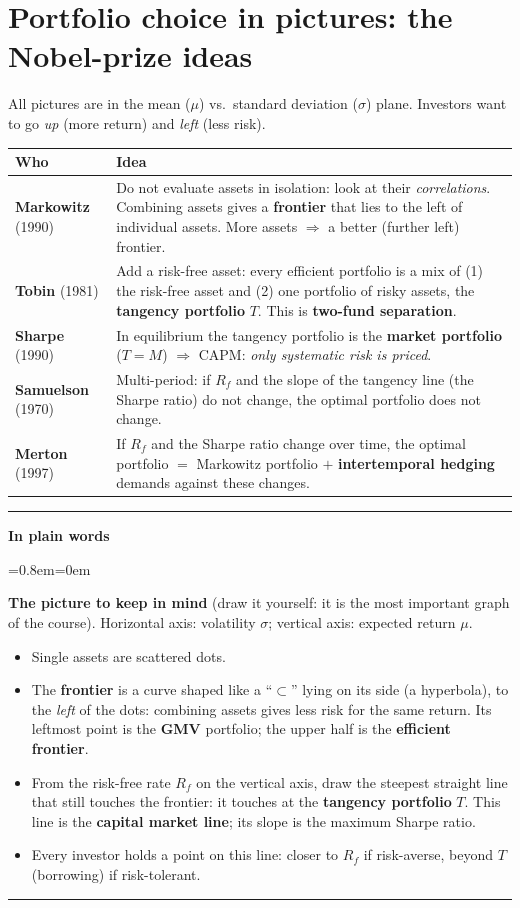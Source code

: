 \documentclass[11pt,a4paper]{report}
\newenvironment{notebox}[1]
  {\par\medskip\Needspace{6\baselineskip}\noindent\rule{\linewidth}{0.4pt}\par\nopagebreak
   \noindent\textbf{#1}\par\nopagebreak
   \begin{list}{}{\leftmargin=0.8em\rightmargin=0em\topsep=2pt}\item[]}
  {\end{list}\nopagebreak\noindent\rule{\linewidth}{0.4pt}\par\medskip}
\newenvironment{plainbox}{\begin{notebox}{In plain words}}{\end{notebox}}
\begin{document}
\section{Portfolio choice in pictures: the Nobel-prize ideas}
All pictures are in the mean ($\mu$) vs.\ standard deviation ($\sigma$) plane.
Investors want to go \emph{up} (more return) and \emph{left} (less risk).
\begin{center}
\begin{tabularx}{\textwidth}{@{}lX@{}}
\toprule
Who & Idea \\
\midrule
\textbf{Markowitz} (1990) & Do not evaluate assets in isolation: look at their
\emph{correlations}. Combining assets gives a \textbf{frontier} that lies to the
left of individual assets. More assets $\Rightarrow$ a better (further left) frontier. \\
\textbf{Tobin} (1981) & Add a risk-free asset: every efficient portfolio is a mix
of (1) the risk-free asset and (2) one portfolio of risky assets, the
\textbf{tangency portfolio} $T$. This is \textbf{two-fund separation}. \\
\textbf{Sharpe} (1990) & In equilibrium the tangency portfolio is the
\textbf{market portfolio} ($T=M$) $\Rightarrow$ CAPM: \emph{only systematic risk is priced}. \\
\textbf{Samuelson} (1970) & Multi-period: if $R_f$ and the slope of the
tangency line (the Sharpe ratio) do not change, the optimal portfolio does not change. \\
\textbf{Merton} (1997) & If $R_f$ and the Sharpe ratio change over time, the
optimal portfolio $=$ Markowitz portfolio $+$ \textbf{intertemporal hedging}
demands against these changes. \\
\bottomrule
\end{tabularx}
\end{center}

\begin{plainbox}
\textbf{The picture to keep in mind} (draw it yourself: it is the most important
graph of the course). Horizontal axis: volatility $\sigma$; vertical axis:
expected return $\mu$.
\begin{itemize}
  \item Single assets are scattered dots.
  \item The \textbf{frontier} is a curve shaped like a ``$\subset$'' lying on its side
    (a hyperbola), to the \emph{left} of the dots: combining assets gives less risk
    for the same return. Its leftmost point is the \textbf{GMV} portfolio; the
    upper half is the \textbf{efficient frontier}.
  \item From the risk-free rate $R_f$ on the vertical axis, draw the steepest
    straight line that still touches the frontier: it touches at the
    \textbf{tangency portfolio} $T$. This line is the \textbf{capital market line};
    its slope is the maximum Sharpe ratio.
  \item Every investor holds a point on this line: closer to $R_f$ if
    risk-averse, beyond $T$ (borrowing) if risk-tolerant.
\end{itemize}
\end{plainbox}
\end{document}
